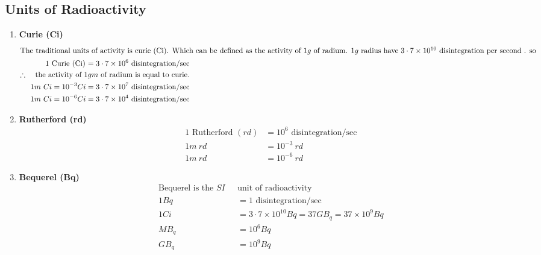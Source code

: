 \subsection{Units of Radioactivity}
\begin{enumerate}
	\item \textbf{ Curie (Ci)}
	\begin{align*}
	\intertext{The traditional units of activity is curie (Ci). Which can be defined as the activity of $1g$ of radium. $1g$ radius have $3\cdot7 \times 10^{10}$ disintegration per second . so}
	\text{$1 $  Curie (Ci) $=3\cdot7\times10^6$ disintegration/sec}\\
	\text{$\therefore$ \quad the activity of $1gm$ of radium is equal to curie.}\\
	\text{$1m \ Ci=10^{-3} Ci=3\cdot 7 \times 10^7 $ disintegration/sec}\\
	\text{$1m \ Ci=10^{-6} Ci=3\cdot 7 \times 10^4 $ disintegration/sec}
	\end{align*}
	\item \textbf{Rutherford (rd)}
	\begin{align*}
	1 \text{ Rutherford } (rd) &= 10^6 \text{ disintegration/sec}\\
	1 m\  rd&=10^{-3}\  rd\\
	1 m\  rd&=10^{-6}\  rd
	\end{align*}
	\item \textbf{Bequerel (Bq)}
	\begin{align*}
	\text{Bequerel is the $SI$ }&\text{unit of radioactivity}\\
	1 Bq&=1 \text{ disintegration/sec}\\
	1Ci&=3\cdot7\times10^{10}Bq =37GB_q=37\times10^9Bq\\
	MB_q&=10^6Bq\\
	GB_q&=10^9Bq
	\end{align*}
\end{enumerate}


